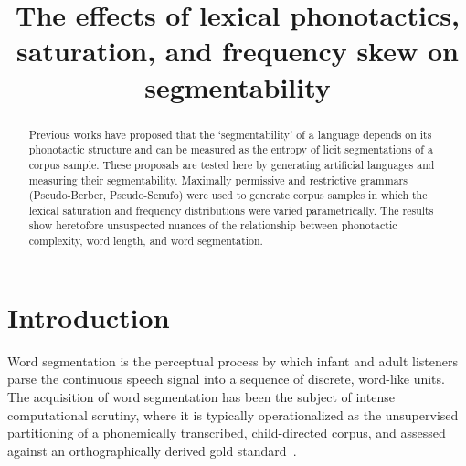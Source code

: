 \documentclass[11pt]{article}
\title{The effects of lexical phonotactics, saturation,
  and frequency skew on segmentability}
\date{}
\begin{document}
\maketitle
\begin{abstract}
  Previous works have proposed that the `segmentability' of a language
  depends on its phonotactic structure and can be measured as the
  entropy of licit segmentations of a corpus sample. These proposals
  are tested here by generating artificial languages and measuring
  their segmentability. Maximally permissive and restrictive grammars
  (Pseudo-Berber, Pseudo-Senufo) were used to generate corpus samples 
  in which the lexical saturation and frequency distributions were
  varied parametrically. The results show heretofore  unsuspected
  nuances of the relationship between phonotactic complexity, word
  length, and word segmentation.
\end{abstract}


\section{Introduction}
\vspace*{-5pt}
Word segmentation is the perceptual process by which infant and adult listeners parse the continuous speech signal into a sequence of discrete, word-like units. The acquisition of word segmentation has been the subject of intense computational scrutiny, where it is typically operationalized as the unsupervised partitioning of a phonemically transcribed, child-directed corpus, and assessed against an orthographically derived gold standard~\cite{Goldwater09a,Daland11a,Pearl10b}.
\end{document}
